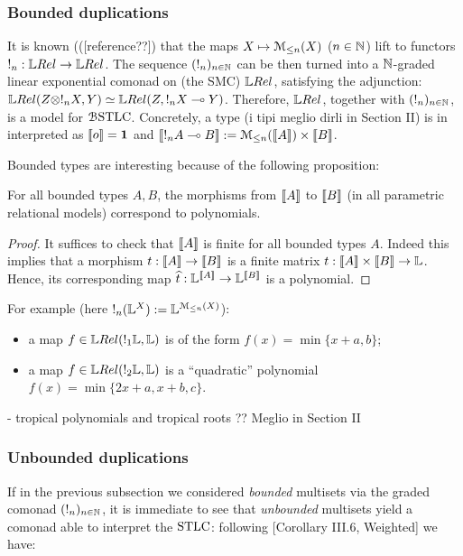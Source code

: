 \subsubsection{Bounded duplications}

It is known {\color{red}(([reference??])} that the maps $X\mapsto \mathcal{M}_{\leq n}(X)$ ($n\in\mathbb{N}$) lift to functors $!_n:\LREL\to\LREL$.
The sequence $(!_n)_{n\in\mathbb{N}}$ can be then turned into a $\mathbb{N}$-graded linear exponential comonad on (the SMC) $\LREL$, satisfying the adjunction:
$\LREL(Z\otimes !_{n}X,Y) \simeq \LREL(Z, !_{n}X\multimap Y)$.
Therefore, $\LREL$, together with $(!_n)_{n\in\mathbb{N}}$, is a model for $\mathcal{B}\mathrm{STLC}$. 
Concretely, a type %
{\color{red}(i tipi meglio dirli in Section II)} is in interpreted as $\llbracket o\rrbracket=\mathbf{1}$ and 
$\llbracket!_{n}A\multimap B\rrbracket:= \mathcal{M}_{\leq n}(\llbracket A\rrbracket) \times \llbracket B\rrbracket$.

Bounded types are interesting because of the following proposition:
\begin{proposition}
For all bounded types $A,B$, the morphisms from $\llbracket A\rrbracket$ to $\llbracket B\rrbracket$ (in all parametric relational models) correspond to polynomials.
\end{proposition}
\begin{proof}
It suffices to check that $\llbracket A\rrbracket$ is finite for all bounded types $A$. Indeed this implies that a morphism $t:\llbracket A\rrbracket\to \llbracket B\rrbracket$ is a finite matrix $t: \llbracket A\rrbracket \times \llbracket B\rrbracket \to \mathbb{L}$.
Hence, its corresponding map $\widehat t:\mathbb{L}^{\llbracket A\rrbracket} \to \mathbb{L}^{\llbracket B\rrbracket}$ is a polynomial.
\end{proof}

For example (here $!_{n}(\mathbb{L}^{X}):= \mathbb{L}^{\mathcal{M}_{\leq n}(X)}$):
\begin{itemize}
\item a map $f\in \LREL( !_{1}\Lawv, \Lawv)$ is of the form $f(x)=\min \{x+a,b\}$;
\item a map $f\in \LREL(!_{2}\Lawv, \Lawv)$ is a ``quadratic'' polynomial $f(x)=\min\{2x+a, x+b, c\}$.
\end{itemize}

- tropical polynomials and tropical roots ?? Meglio in Section II

\subsubsection{Unbounded duplications}

If in the previous subsection we considered \emph{bounded} multisets via the graded comonad $(!_n)_{n\in\mathbb{N}}$, it is immediate to see that \emph{unbounded} multisets yield a comonad able to interpret the $\mathrm{STLC}$:
following [Corollary III.6, Weighted] we have:

